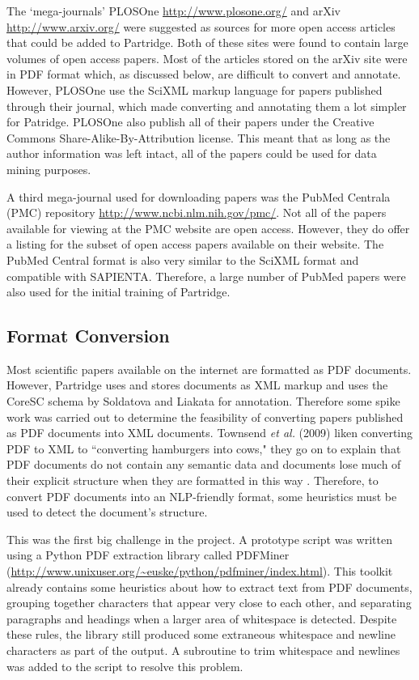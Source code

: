 The `mega-journals' PLOSOne \url{http://www.plosone.org/} and arXiv
\url{http://www.arxiv.org/} were suggested as sources for more open access
articles that could be added to Partridge. Both of these sites were found to
contain large volumes of open access papers. Most of the articles stored on the
arXiv site were in PDF format which, as discussed below, are difficult to
convert and annotate. However, PLOSOne use the SciXML markup language for
papers published through their journal, which made converting and annotating
them a lot simpler for Patridge. PLOSOne also publish all of their papers under
the Creative Commons Share-Alike-By-Attribution license\cite{ccbyattr}. This
meant that as long as the author information was left intact, all of the papers
could be used for data mining purposes.

A third mega-journal used for downloading papers was the PubMed Centrala (PMC)
repository \url{http://www.ncbi.nlm.nih.gov/pmc/}. Not all of
the papers available for viewing at the PMC website are open access. However,
they do offer a listing for the subset of open access papers available on their
website. The PubMed Central format is also very similar to the SciXML format
and compatible with SAPIENTA. Therefore, a large number of PubMed papers were
also used for the initial training of Partridge.

\subsection{Format Conversion} Most scientific papers available on the internet
are formatted as PDF documents. However, Partridge uses and stores documents as
XML markup and uses the CoreSC schema by Soldatova and
Liakata\cite{liakata2008guidelines} for annotation. Therefore some spike work
was carried out to determine the feasibility of converting papers published as
PDF documents into XML documents. Townsend \emph{et al.} (2009) liken
converting PDF to XML to ``converting hamburgers into cows," they go on to
explain that PDF documents do not contain any semantic data and documents lose
much of their explicit structure when they are formatted in this way
\cite{Townsend2009}.  Therefore, to convert PDF documents into an NLP-friendly
format, some heuristics must be used to detect the document's
structure\cite{pdfminer}.

This was the first big challenge in the project. A prototype script was written
using a Python PDF extraction library called PDFMiner
(\url{http://www.unixuser.org/~euske/python/pdfminer/index.html}).  This
toolkit already contains some heuristics about how to extract text from PDF
documents, grouping together characters that appear very close to each other,
and separating paragraphs and headings when a larger area of whitespace is
detected\cite{pdfminer}. Despite these rules, the library still produced some
extraneous whitespace and newline characters as part of the output. A
subroutine to trim whitespace and newlines was added to the script to resolve
this problem. 

